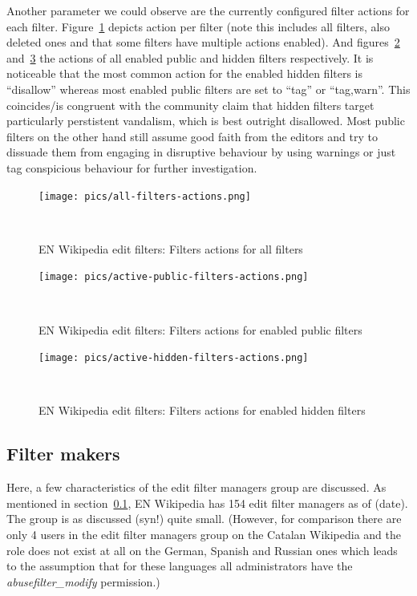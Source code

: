 Another parameter we could observe are the currently configured filter actions for each filter.
Figure~\ref{fig:all-filters-actions} depicts action per filter (note this includes all filters, also deleted ones and that some filters have multiple actions enabled).
And figures~\ref{fig:active-public-actions} and~\ref{fig:active-hidden-actions} the actions of all enabled public and hidden filters respectively.
It is noticeable that the most common action for the enabled hidden filters is ``disallow'' whereas most enabled public filters are set to ``tag'' or ``tag,warn''.
This coincides/is congruent with the community claim that hidden filters target particularly perstistent vandalism, which is best outright disallowed.
Most public filters on the other hand still assume good faith from the editors and try to dissuade them from engaging in disruptive behaviour by using warnings or just tag conspicious behaviour for further investigation.

\begin{figure}
\centering
  \texttt{[image: pics/all-filters-actions.png]}
  \caption{EN Wikipedia edit filters: Filters actions for all filters}~\label{fig:all-filters-actions}
\end{figure}

\begin{figure}
\centering
  \texttt{[image: pics/active-public-filters-actions.png]}
  \caption{EN Wikipedia edit filters: Filters actions for enabled public filters}~\label{fig:active-public-actions}
\end{figure}

\begin{figure}
\centering
  \texttt{[image: pics/active-hidden-filters-actions.png]}
  \caption{EN Wikipedia edit filters: Filters actions for enabled hidden filters}~\label{fig:active-hidden-actions}
\end{figure}


\subsection{Filter makers}

Here, a few characteristics of the edit filter managers group are discussed.
As mentioned in section~\ref{}, EN Wikipedia has 154 edit filter managers as of (date).
The group is as discussed (syn!) quite small.
(However, for comparison there are only 4 users in the edit filter managers group on the Catalan Wikipedia and the role does not exist at all on the German, Spanish and Russian ones which leads to the assumption that for these languages all administrators have the \emph{abusefilter\_modify} permission.)


